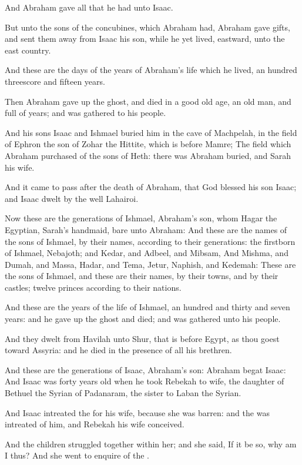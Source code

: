\verse And Abraham gave all that he had unto Isaac.

\verse But unto the sons of the concubines, which Abraham had, Abraham
gave gifts, and sent them away from Isaac his son, while he yet lived,
eastward, unto the east country.

\verse And these are the days of the years of Abraham's life which he
lived, an hundred threescore and fifteen years.

\verse Then Abraham gave up the ghost, and died in a good old age, an
old man, and full of years; and was gathered to his people.

\verse And his sons Isaac and Ishmael buried him in the cave of
Machpelah, in the field of Ephron the son of Zohar the Hittite, which
is before Mamre; \verse The field which Abraham purchased of the sons
of Heth: there was Abraham buried, and Sarah his wife.

\verse And it came to pass after the death of Abraham, that God blessed
his son Isaac; and Isaac dwelt by the well Lahairoi.

\verse Now these are the generations of Ishmael, Abraham's son, whom
Hagar the Egyptian, Sarah's handmaid, bare unto Abraham: \verse And
these are the names of the sons of Ishmael, by their names, according
to their generations: the firstborn of Ishmael, Nebajoth; and Kedar,
and Adbeel, and Mibsam, \verse And Mishma, and Dumah, and Massa, \verse
Hadar, and Tema, Jetur, Naphish, and Kedemah: \verse These are the sons
of Ishmael, and these are their names, by their towns, and by their
castles; twelve princes according to their nations.

\verse And these are the years of the life of Ishmael, an hundred and
thirty and seven years: and he gave up the ghost and died; and was
gathered unto his people.

\verse And they dwelt from Havilah unto Shur, that is before Egypt, as
thou goest toward Assyria: and he died in the presence of all his
brethren.

\verse And these are the generations of Isaac, Abraham's son: Abraham
begat Isaac: \verse And Isaac was forty years old when he took Rebekah
to wife, the daughter of Bethuel the Syrian of Padanaram, the sister
to Laban the Syrian.

\verse And Isaac intreated the \LORD for his wife, because she was
barren: and the \LORD was intreated of him, and Rebekah his wife
conceived.

\verse And the children struggled together within her; and she said, If
it be so, why am I thus? And she went to enquire of the \LORD.

